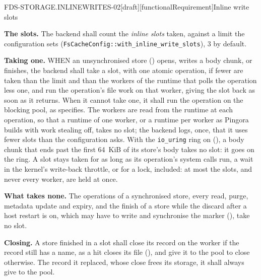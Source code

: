 \begin{requirement}{FDS-STORAGE.INLINEWRITES-02}[draft][functionalRequirement]{Inline write slots}


  \textbf{The slots.} The backend shall count the \emph{inline slots}
  taken, against a limit the configuration sets
  (\texttt{FsCacheConfig::with\_inline\_write\_slots}), 3 by default.

  \textbf{Taking one.} WHEN an unsynchronised store
  () opens, writes a body chunk, or
  finishes, the backend shall take a slot, with one atomic operation, if
  fewer are taken than the limit and than the workers of the runtime that
  polls the operation less one, and run the operation's file work on that
  worker, giving the slot back as soon as it returns. When it cannot take
  one, it shall run the operation on the blocking pool, as
   specifies. The workers are read from the
  runtime at each operation, so that a runtime of one worker, or a runtime
  per worker as Pingora builds with work stealing off, takes no slot; the
  backend logs, once, that it uses fewer slots than the configuration asks.
  With the \texttt{io\_uring} ring on (), a
  body chunk that ends past the first 64~KiB of its store's body takes no
  slot: it goes on the ring.
  A slot stays taken for as long as its operation's system calls run, a
  wait in the kernel's write-back throttle, or for a lock, included: at most
  the slots, and never every worker, are held at once.

  \textbf{What takes none.} The operations of a synchronised store, every
  read, purge, metadata update and expiry, and the finish of a store while
  the discard after a host restart is on, which may have to write and
  synchronise the marker (), take
  no slot.

  \textbf{Closing.} A store finished in a slot shall close its record on
  the worker if the record still has a name, as a hit closes its file
  (), and give it to the pool to close
  otherwise. The record it replaced, whose close frees its storage, it
  shall always give to the pool.



\end{requirement}

